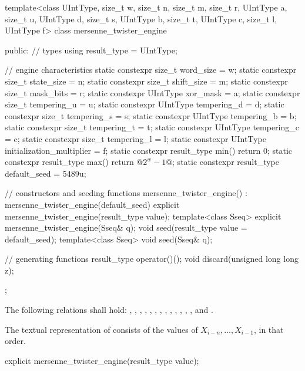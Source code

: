 %
%
\begin{codeblock}
template<class UIntType, size_t w, size_t n, size_t m, size_t r,
         UIntType a, size_t u, UIntType d, size_t s,
         UIntType b, size_t t,
         UIntType c, size_t l, UIntType f>
  class mersenne_twister_engine {
  public:
    // types
    using result_type = UIntType;

    // engine characteristics
    static constexpr size_t word_size = w;
    static constexpr size_t state_size = n;
    static constexpr size_t shift_size = m;
    static constexpr size_t mask_bits = r;
    static constexpr UIntType xor_mask = a;
    static constexpr size_t tempering_u = u;
    static constexpr UIntType tempering_d = d;
    static constexpr size_t tempering_s = s;
    static constexpr UIntType tempering_b = b;
    static constexpr size_t tempering_t = t;
    static constexpr UIntType tempering_c = c;
    static constexpr size_t tempering_l = l;
    static constexpr UIntType initialization_multiplier = f;
    static constexpr result_type min() { return 0; }
    static constexpr result_type max() { return  @$2^w - 1$@; }
    static constexpr result_type default_seed = 5489u;

    // constructors and seeding functions
    mersenne_twister_engine() : mersenne_twister_engine(default_seed) {}
    explicit mersenne_twister_engine(result_type value);
    template<class Sseq> explicit mersenne_twister_engine(Sseq& q);
    void seed(result_type value = default_seed);
    template<class Sseq> void seed(Sseq& q);

    // generating functions
    result_type operator()();
    void discard(unsigned long long z);
  };
\end{codeblock}

\pnum
The following relations shall hold:
  ,
  ,
  ,
  ,
  ,
  ,
  ,
  ,
  ,
  ,
  ,
  ,
  ,
and
  .

\pnum
The textual representation%
of 
consists of the values of $X_{i - n}, \dotsc, X_{i - 1}$,
in that order.

%
\begin{itemdecl}
explicit mersenne_twister_engine(result_type value);
\end{itemdecl}


